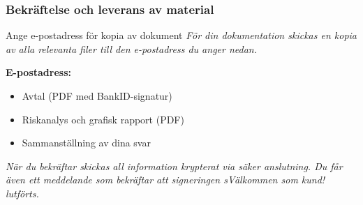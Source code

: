 \documentclass[10pt]{beamer}
\begin{document}
\begin{frame}[fragile]
  \frametitle{Bekräftelse och leverans av material}

  \begin{block}{Ange e-postadress för kopia av dokument}
    \vspace{0.2cm}
    \textit{För din dokumentation skickas en kopia av alla relevanta filer till den e-postadress du anger nedan.}
    \vspace{0.4cm}

    \textbf{E-postadress:} \underline{\hspace{6cm}}
    \vspace{0.5cm}

    \begin{itemize}
      \item Avtal (PDF med BankID-signatur)
      \item Riskanalys och grafisk rapport (PDF)
      \item Sammanställning av dina svar
    \end{itemize}
  \end{block}

  \vspace{0.5cm}
  \begin{center}
  \end{center}

  \vspace{0.6cm}
  \small
  \textit{När du bekräftar skickas all information krypterat via säker anslutning.  
  Du får även ett meddelande som bekräftar att signeringen sVälkommen som kund! 🎉lutförts.}

\end{frame}

\end{document}
